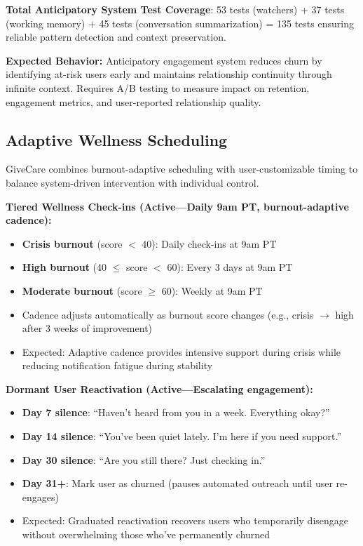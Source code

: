 \documentclass{article}
\begin{document}
\textbf{Total Anticipatory System Test Coverage}: 53 tests (watchers) + 37 tests (working memory) + 45 tests (conversation summarization) = 135 tests ensuring reliable pattern detection and context preservation.

\textbf{Expected Behavior:} Anticipatory engagement system reduces churn by identifying at-risk users early and maintains relationship continuity through infinite context. Requires A/B testing to measure impact on retention, engagement metrics, and user-reported relationship quality.

%
\subsection{Adaptive Wellness Scheduling}%
\label{subsec:AdaptiveWellnessScheduling}%
GiveCare combines burnout-adaptive scheduling with user-customizable timing to balance system-driven intervention with individual control.

\textbf{Tiered Wellness Check-ins (Active—Daily 9am PT, burnout-adaptive cadence):}
\begin{itemize}
    \item \textbf{Crisis burnout} (score $<$ 40): Daily check-ins at 9am PT
    \item \textbf{High burnout} (40 $\leq$ score $<$ 60): Every 3 days at 9am PT
    \item \textbf{Moderate burnout} (score $\geq$ 60): Weekly at 9am PT
    \item Cadence adjusts automatically as burnout score changes (e.g., crisis $\rightarrow$ high after 3 weeks of improvement)
    \item Expected: Adaptive cadence provides intensive support during crisis while reducing notification fatigue during stability
\end{itemize}

\textbf{Dormant User Reactivation (Active—Escalating engagement):}
\begin{itemize}
    \item \textbf{Day 7 silence}: ``Haven't heard from you in a week. Everything okay?''
    \item \textbf{Day 14 silence}: ``You've been quiet lately. I'm here if you need support.''
    \item \textbf{Day 30 silence}: ``Are you still there? Just checking in.''
    \item \textbf{Day 31+}: Mark user as churned (pauses automated outreach until user re-engages)
    \item Expected: Graduated reactivation recovers users who temporarily disengage without overwhelming those who've permanently churned
\end{itemize}
\end{document}
